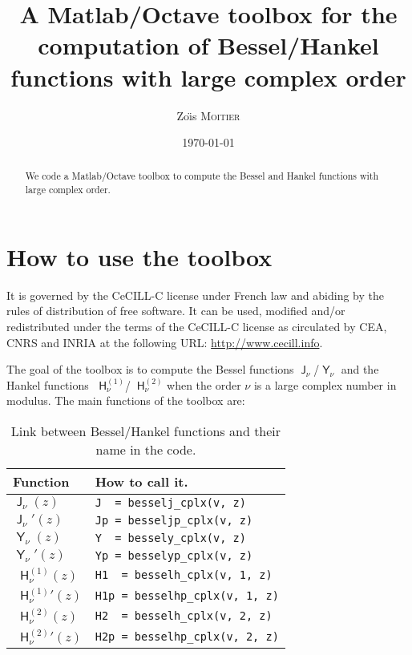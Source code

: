 \documentclass[12pt,a4paper]{article}
\title{A Matlab/Octave toolbox for the computation of Bessel/Hankel
functions with large complex order}
\author{Zo{\"\i}s \textsc{Moitier}}
\date{\today}
\numberwithin{equation}{section}
\DeclareMathOperator{\bJ}{\mathsf{J}}
\DeclareMathOperator{\bY}{\mathsf{Y}}
\newcommand{\hO}{\mathop{}\!\mathsf{H}^{(1)}}
\newcommand{\hT}{\mathop{}\!\mathsf{H}^{(2)}}
\theoremstyle{definition}
\theoremstyle{plain}
\theoremstyle{remark}
\begin{document}
\maketitle

\begin{abstract}
    We code a Matlab/Octave toolbox to compute the Bessel and Hankel functions with large complex order.
\end{abstract}


\section{How to use the toolbox}

It is governed by the CeCILL-C license under French law and abiding by the rules of distribution of free software.
It can be used, modified and/or redistributed under the terms of the CeCILL-C license as circulated by CEA, CNRS and INRIA at the following URL\@: \url{http://www.cecill.info}.

\bigskip

The goal of the toolbox is to compute the Bessel functions \( \bJ_\nu \)/\( \bY_\nu \) and the Hankel functions \( \hO_\nu \)/\( \hT_\nu \) when the order \( \nu \) is a large complex number in modulus.
The main functions of the toolbox are:
\begin{table}[!hbtp]
    \centering
    \renewcommand{\arraystretch}{1.2}
    \renewcommand{\tabcolsep}{1em}
    \begin{tabular}{ll}
        \toprule
        Function            & How to call it.
        \\\midrule
        \( \bJ_\nu(z) \)    & \verb|J  = besselj_cplx(v, z)|
        \\
        \( \bJ_\nu'(z) \)   & \verb|Jp = besseljp_cplx(v, z)|
        \\[1ex]
        \( \bY_\nu(z) \)    & \verb|Y  = bessely_cplx(v, z)|
        \\
        \( \bY_\nu'(z) \)   & \verb|Yp = besselyp_cplx(v, z)|
        \\[1ex]
        \( \hO_\nu(z) \)    & \verb|H1  = besselh_cplx(v, 1, z)|
        \\
        \( {\hO_\nu}'(z) \) & \verb|H1p = besselhp_cplx(v, 1, z)|
        \\[1ex]
        \( \hT_\nu(z) \)    & \verb|H2  = besselh_cplx(v, 2, z)|
        \\
        \( {\hT_\nu}'(z) \) & \verb|H2p = besselhp_cplx(v, 2, z)|
        \\\bottomrule
    \end{tabular}
    \caption{Link between Bessel/Hankel functions and their name in the code.}
\end{table}
\end{document}
